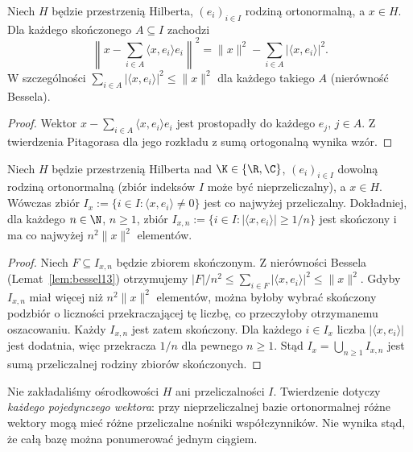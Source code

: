 \begin{lemat}
\label{lem:bessel13}
Niech $H$ będzie przestrzenią Hilberta, $(e_i)_{i\in I}$ rodziną
ortonormalną, a $x\in H$. Dla każdego skończonego $A\subseteq I$
zachodzi
\[
\left\|x-\sum_{i\in A}\langle x,e_i\rangle e_i\right\|^2
=\|x\|^2-\sum_{i\in A}|\langle x,e_i\rangle|^2.
\]
W szczególności $\sum_{i\in A}|\langle x,e_i\rangle|^2\le\|x\|^2$
dla każdego takiego $A$ (nierówność Bessela).
\end{lemat}
\begin{proof}
Wektor $x-\sum_{i\in A}\langle x,e_i\rangle e_i$ jest
prostopadły do każdego $e_j$, $j\in A$. Z twierdzenia Pitagorasa
dla jego rozkładu z sumą ortogonalną wynika wzór.
\end{proof}


\begin{twierdzenie}
\label{thm:countable-fourier-support13}
Niech $H$ będzie przestrzenią Hilberta nad $\K\in\{\R,\C\}$,
$(e_i)_{i\in I}$ dowolną rodziną ortonormalną (zbiór indeksów $I$
może być nieprzeliczalny), a $x\in H$. Wówczas zbiór
$ I_x:=\{i\in I:\langle x,e_i\rangle\ne0\}$
jest co najwyżej przeliczalny. Dokładniej, dla każdego $n\in\N$,
$n\ge1$, zbiór
$ I_{x,n}:=\{i\in I:|\langle x,e_i\rangle|\ge1/n\}$
jest skończony i ma co najwyżej $n^2\|x\|^2$ elementów.
\end{twierdzenie}
\begin{proof}
Niech $F\subseteq I_{x,n}$ będzie zbiorem skończonym.
Z nierówności Bessela (Lemat~\ref{lem:bessel13}) otrzymujemy
$|F|/n^2\le\sum_{i\in F}|\langle x,e_i\rangle|^2\le\|x\|^2$.
Gdyby $I_{x,n}$ miał więcej niż $n^2\|x\|^2$ elementów,
można byłoby wybrać skończony podzbiór o liczności
przekraczającej tę liczbę, co przeczyłoby otrzymanemu oszacowaniu.
Każdy $I_{x,n}$ jest zatem skończony. Dla każdego
$i\in I_x$ liczba $|\langle x,e_i\rangle|$ jest dodatnia, więc
przekracza $1/n$ dla pewnego $n\ge1$. Stąd
$I_x=\bigcup_{n\ge1}I_{x,n}$ jest sumą przeliczalnej rodziny
zbiorów skończonych.
\end{proof}

\begin{uwaga}
\label{rem:fourier-countability13}
Nie zakładaliśmy ośrodkowości $H$ ani przeliczalności $I$.
Twierdzenie dotyczy \emph{każdego pojedynczego wektora}:
przy nieprzeliczalnej bazie ortonormalnej różne wektory mogą
mieć różne przeliczalne nośniki współczynników. Nie wynika
stąd, że całą bazę można ponumerować jednym ciągiem.
\end{uwaga}

